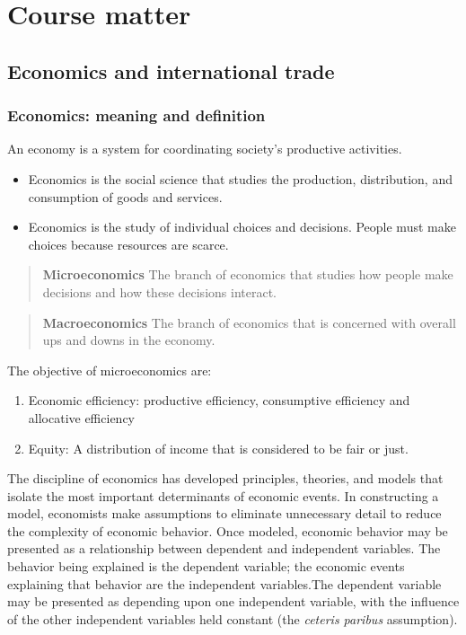 \documentclass[11pt,]{book}
\providecommand{\tightlist}{%
  \setlength{\itemsep}{0pt}\setlength{\parskip}{0pt}}
\theoremstyle{definition}
\theoremstyle{definition}
\theoremstyle{definition}
\theoremstyle{remark}
\begin{document}
\part{Course matter}\label{part-course-matter}

\chapter{Economics and international
trade}\label{economics-and-international-trade}

\section{Economics: meaning and
definition}\label{economics-meaning-and-definition}

An economy is a system for coordinating society's productive activities.

\begin{itemize}
\tightlist
\item
  Economics is the social science that studies the production,
  distribution, and consumption of goods and services.
\item
  Economics is the study of individual choices and decisions. People
  must make choices because resources are scarce.
\end{itemize}

\begin{quote}
\textbf{Microeconomics} \newline The branch of economics that studies
how people make decisions and how these decisions interact.
\end{quote}

\begin{quote}
\textbf{Macroeconomics} \newline The branch of economics that is
concerned with overall ups and downs in the economy.
\end{quote}

The objective of microeconomics are:

\begin{enumerate}
\def\labelenumi{\arabic{enumi}.}
\tightlist
\item
  Economic efficiency: productive efficiency, consumptive efficiency and
  allocative efficiency
\item
  Equity: A distribution of income that is considered to be fair or
  just.
\end{enumerate}

The discipline of economics has developed principles, theories, and
models that isolate the most important determinants of economic events.
In constructing a model, economists make assumptions to eliminate
unnecessary detail to reduce the complexity of economic behavior. Once
modeled, economic behavior may be presented as a relationship between
dependent and independent variables. The behavior being explained is the
dependent variable; the economic events explaining that behavior are the
independent variables.The dependent variable may be presented as
depending upon one independent variable, with the influence of the other
independent variables held constant (the \emph{ceteris paribus}
assumption).
\end{document}
